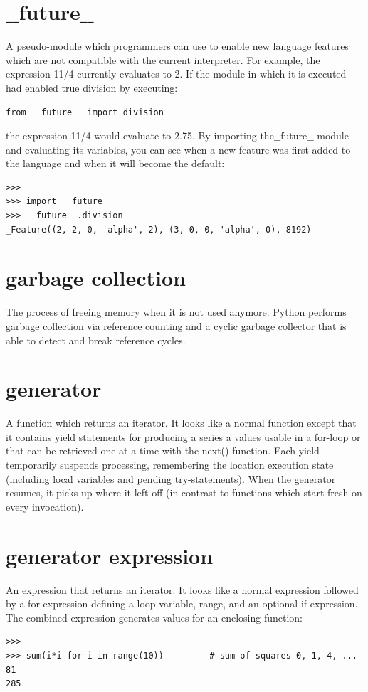 \documentclass[12pt,a4paper,final,twoside,onecolumn,titlepage]{book}
\begin{document}
\section{$\_\_$future$\_\_$}
A pseudo-module which programmers can use to enable new language features which are not compatible with the current interpreter. For example, the expression 11/4 currently evaluates to 2. If the module in which it is executed had enabled true division by executing:

\begin{lstlisting}
from __future__ import division
\end{lstlisting}
the expression 11/4 would evaluate to 2.75. By importing the$\_\_$future$\_\_$ module and evaluating its variables, you can see when a new feature was first added to the language and when it will become the default:
\begin{lstlisting}
>>>
>>> import __future__
>>> __future__.division
_Feature((2, 2, 0, 'alpha', 2), (3, 0, 0, 'alpha', 0), 8192)
\end{lstlisting}

\section{garbage collection}
The process of freeing memory when it is not used anymore. Python performs garbage collection via reference counting and a cyclic garbage collector that is able to detect and break reference cycles.

\section{generator}
A function which returns an iterator. It looks like a normal function except that it contains yield statements for producing a series a values usable in a for-loop or that can be retrieved one at a time with the next() function. Each yield temporarily suspends processing, remembering the location execution state (including local variables and pending try-statements). When the generator resumes, it picks-up where it left-off (in contrast to functions which start fresh on every invocation).

\section{generator expression}
An expression that returns an iterator. It looks like a normal expression followed by a for expression defining a loop variable, range, and an optional if expression. The combined expression generates values for an enclosing function:
\begin{lstlisting}
>>>
>>> sum(i*i for i in range(10))         # sum of squares 0, 1, 4, ... 81
285
\end{lstlisting}
\end{document}
